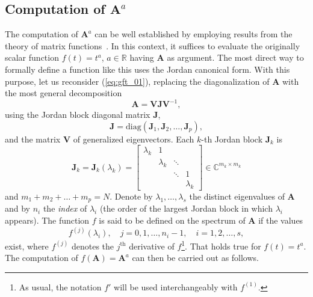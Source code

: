 \subsection{Computation of $\mathbf{A}^{{a}}$}\label{subsec:comp}
The computation of $\mathbf{A}^a$ can be well established by employing results from the theory of matrix functions~\cite{higham2008functions}. In this context, it suffices to evaluate the originally scalar function $f(t)=t^a$, $a\in\mathbb{R}$ having $\mathbf{A}$ as argument. The most direct way to formally define a function like this uses the Jordan canonical form. With this purpose, let us reconsider (\ref{eq:gft_01}), replacing the diagonalization of $\mathbf{A}$ with the most general decomposition
\begin{equation}
\label{eq:Ajordan}
\mathbf{A} = \mathbf{V} \mathbf{J} \mathbf{V}^{-1},
\end{equation}
using the Jordan block diagonal matrix $\mathbf{J}$,
\begin{equation}\label{eq:jcf}
    \mathbf{J}=\mathrm{diag}(\mathbf{J}_1,\mathbf{J}_2,\ldots,\mathbf{J}_p),
\end{equation}
and the matrix $\mathbf{V}$ of generalized eigenvectors. Each $k$-th Jordan block $\mathbf{J}_k$ is
\begin{equation}
    \mathbf{J}_k=\mathbf{J}_k(\lambda_k)=\left[\begin{array}{cccc}
    \lambda_k&1&&\\
    &\lambda_k&\ddots &\\
    &&\ddots & 1\\
    &&&\lambda_k
    \end{array}\right]\in\mathbb{C}^{m_k\times m_k}
\end{equation}
and $m_1+m_2+\ldots +m_p=N$. Denote by $\lambda_1,\ldots,\lambda_s$ the distinct eigenvalues of $\mathbf{A}$ and by $n_i$ the \emph{index} of $\lambda_i$ (the order of the largest Jordan block in which $\lambda_i$ appears). The function $f$ is said to be defined on the spectrum of $\mathbf{A}$ if the values
\begin{equation}\label{eq:defspec}
    f^{(j)}(\lambda_i),\quad j=0,1,\ldots,n_i-1,\quad i=1,2,\ldots,s,
\end{equation}
exist, where $f^{(j)}$ denotes the $j^{\textrm{th}}$ derivative of $f$\footnote{As usual, the notation $f'$ will be used interchangeably with $f^{(1)}$.}. That holds true for $f(t)=t^a$. The computation of $f(\mathbf{A})=\mathbf{A}^a$ can then be carried out as follows.
\vspace{0.2cm}
